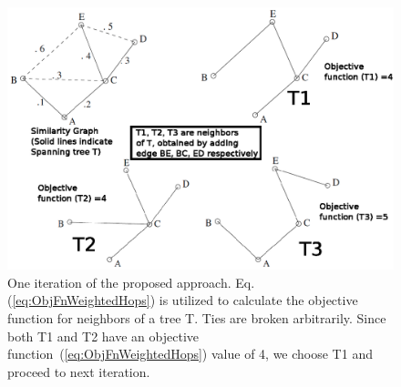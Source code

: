 \begin{figure}[htbp]
\begin{center}
\centering
\includegraphics[width=0.8\linewidth]{TagTree/LSOneiteration}
\caption{One iteration of the proposed approach. Eq. (\ref{eq:ObjFnWeightedHops}) is utilized to calculate the objective function for neighbors of a tree T. Ties are broken arbitrarily. Since both T1 and T2 have an objective function~(\ref{eq:ObjFnWeightedHops}) value of 4, we choose T1 and proceed to next iteration. } 
\label{fig:neighborhood}
\end{center}
\end{figure}
